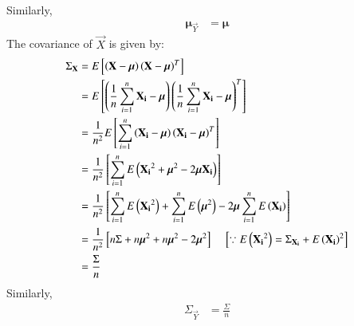 \documentclass[journal,12pt,onecolumn]{IEEEtran}
\theoremstyle{remark}
\begin{document}
Similarly,
\begin{align}
{\bm{\mu}}_{\vec{Y}} &= \bm{\mu}
\end{align}
The covariance of $\vec{X}$ is given by: 
\begin{align}
\Sigma_{\mathbf{X}} &= E{}\left[\left(\mathbf{X}-\bm{\mu}\right){\left(\mathbf{X}-\bm{\mu}\right)}^T\right] \\
                 &= E{}\left[\left(\frac{1}{n}\sum_{i=1}^{n}\mathbf{X_i}-\bm{\mu}\right){\left(\frac{1}{n}\sum_{i=1}^{n}\mathbf{X_i}-\bm{\mu}\right)}^T\right] \\
                 &= \frac{1}{n^2}E{}\left[\sum_{i=1}^{n}\left(\mathbf{X_i}-\bm{\mu}\right){\left(\mathbf{X_i}-\bm{\mu}\right)}^T\right] \\
                 &= \frac{1}{n^2}{}\left[\sum_{i=1}^{n}E\left({\mathbf{X_i}}^2+{\bm{\mu}}^2-2\bm{\mu}\mathbf{X_i}\right)\right] \\
                 &= \frac{1}{n^2}{}\left[\sum_{i=1}^{n}E\left({\mathbf{X_i}}^2\right)+\sum_{i=1}^{n}E\left({\bm{\mu}}^2\right)-2\bm{\mu}\sum_{i=1}^{n}E\left(\mathbf{X_i}\right)\right] \\
                 &= \frac{1}{n^2}{}\left[n\Sigma+n{\bm{\mu}}^2+n{\bm{\mu}}^2-2{\bm{\mu}}^2\right] \quad {}\left[\because E\left({\mathbf{X_i}}^2\right)={\Sigma}_{\mathbf{X_i}}+{E\left(\mathbf{X_i}\right)}^2\right] \\
                 &= \frac{\Sigma}{n}         
\end{align}
Similarly,
\begin{align}
\Sigma_{\vec{Y}} &= \frac{\Sigma}{n} 
\end{align}
\end{document}
